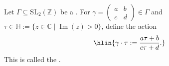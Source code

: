 \begin{definition} \label{definition:modular_action_of_a_subgroup_of_SL_2_Z_on_the_upper_half_plane}
    Let $\Gamma \subseteq \mathrm{SL}_2(\mathbb{Z})$ be a . 
    For $\gamma = \begin{pmatrix} a & b \\ c & d \end{pmatrix}\in \Gamma$ and $\tau \in \mathbb{H} := \{ z \in \mathbb{C} \mid \operatorname{Im}(z) > 0 \}$, define the action
    $$\hlin{\gamma \cdot \tau := \frac{a\tau + b}{c\tau + d}.}$$
    This is called the .
\end{definition}
